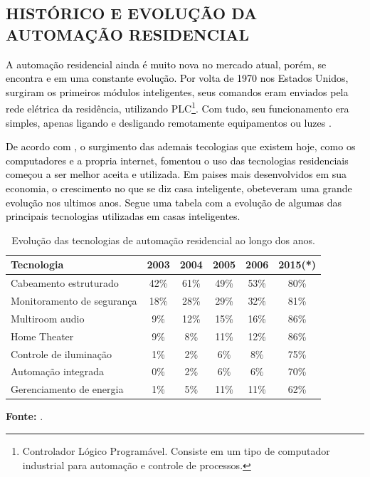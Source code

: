     

    \subsection{HISTÓRICO E EVOLUÇÃO DA AUTOMAÇÃO RESIDENCIAL}
        \textcolor{black}{A automação residencial ainda é muito nova no mercado atual, porém, se encontra e em uma constante evolução. Por volta de 1970 nos Estados Unidos, surgiram os primeiros módulos inteligentes, seus comandos eram enviados pela rede elétrica da residência, utilizando PLC\footnote{Controlador Lógico Programável. Consiste em um tipo de computador industrial para automação e controle de processos.}. Com tudo, seu funcionamento era simples, apenas ligando e desligando remotamente equipamentos ou luzes \cite{automacaoResidencialCap1}.}

        \textcolor{black}{De acordo com \cite{automacaoResidencialCap1}, o surgimento das ademais tecologias que existem hoje, como os computadores e a propria internet, fomentou o uso das tecnologias residenciais começou a ser melhor aceita e utilizada. Em paises mais desenvolvidos em sua economia, o crescimento no que se diz casa inteligente, obeteveram uma grande evolução nos ultimos anos. Segue uma tabela com a evolução de algumas das principais tecnologias utilizadas em casas inteligentes.}

        \begin{table}[H]
            \centering
            \renewcommand{\arraystretch}{1.3}
            \setlength{\tabcolsep}{10pt}
            \begin{tabular}{lccccc}
            \hline
            \textbf{Tecnologia} & \textbf{2003} & \textbf{2004} & \textbf{2005} & \textbf{2006} & \textbf{2015(*)} \\
            \hline
            Cabeamento estruturado & 42\% & 61\% & 49\% & 53\% & 80\% \\
            Monitoramento de segurança & 18\% & 28\% & 29\% & 32\% & 81\% \\
            Multiroom audio & 9\% & 12\% & 15\% & 16\% & 86\% \\
            Home Theater & 9\% & 8\% & 11\% & 12\% & 86\% \\
            Controle de iluminação & 1\% & 2\% & 6\% & 8\% & 75\% \\
            Automação integrada & 0\% & 2\% & 6\% & 6\% & 70\% \\
            Gerenciamento de energia & 1\% & 5\% & 11\% & 11\% & 62\% \\
            \hline
            \end{tabular}
            \caption{Evolução das tecnologias de automação residencial ao longo dos anos.}
            \label{tab:tecnologias-automacao}

            \vspace{0.5em}
            \small
            \textbf{Fonte:} \cite{automacaoResidencialCap1}.\\
        \end{table}

